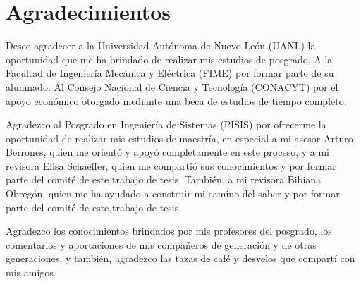 
\chapter{Agradecimientos}

Deseo agradecer a la Universidad Autónoma de Nuevo León (UANL) la oportunidad que me ha brindado de realizar mis estudios de posgrado. A la Facultad de Ingeniería Mecánica y Eléctrica (FIME) por formar parte de su alumnado. Al Consejo Nacional de Ciencia y Tecnología (CONACYT) por el apoyo económico otorgado mediante una beca de estudios de tiempo completo.

Agradezco al Posgrado en Ingeniería de Sistemas (PISIS) por ofrecerme la oportunidad de realizar mis estudios de maestría, en especial a mi asesor Arturo Berrones, quien me orientó y apoyó completamente en este proceso, y a mi revisora Elisa Schaeffer, quien me compartió sus conocimientos y por formar parte del comité de este trabajo de tesis. También, a mi revisora Bibiana Obregón, quien me ha ayudado a construir mi camino del saber y por formar parte del comité de este trabajo de tesis.

Agradezco los conocimientos brindados por mis profesores del posgrado, los comentarios y aportaciones de mis compañeros de generación y de otras generaciones, y también, agradezco las tazas de café y desvelos que compartí con mis amigos.
